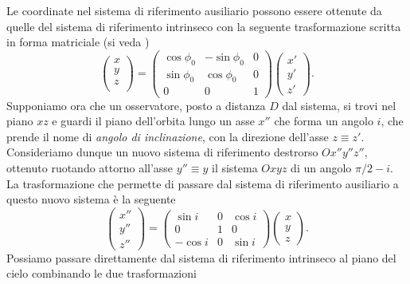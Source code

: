 {Le coordinate nel sistema di riferimento ausiliario possono essere ottenute da
quelle del sistema di riferimento intrinseco con la seguente trasformazione
scritta in forma matriciale (si veda \textcite{goldstein:meccanica})
\begin{equation}
  \begin{pmatrix}
    x \\
    y \\
    z \\
  \end{pmatrix} =
  \begin{pmatrix}
    \cos\phi_0 & -\sin\phi_0 & 0 \\
    \sin\phi_0 & \cos\phi_0  & 0 \\
    0          & 0           & 1
  \end{pmatrix}
  \begin{pmatrix}
    x' \\
    y' \\
    z'
  \end{pmatrix}.
\end{equation}
Supponiamo ora che un osservatore, posto a distanza $D$ dal sistema, si trovi
nel piano $xz$ e guardi il piano dell'orbita lungo un asse $x''$ che forma un
angolo $i$, che prende il nome di \emph{angolo di inclinazione}, con la
direzione dell'asse $z\equiv z'$. Consideriamo dunque un nuovo sistema di
riferimento destrorso $Ox''y''z''$, ottenuto ruotando attorno all'asse
$y''\equiv y$ il sistema $Oxyz$ di un angolo $\pi/2 - i$. La trasformazione che
permette di passare dal sistema di riferimento ausiliario a questo nuovo sistema
è la seguente
\begin{equation}
  \begin{pmatrix}
    x'' \\
    y'' \\
    z''
  \end{pmatrix} =
  \begin{pmatrix}
    \sin i  & 0 & \cos i \\
    0       & 1 & 0      \\
    -\cos i & 0 & \sin i
  \end{pmatrix}
  \begin{pmatrix}
    x \\
    y \\
    z
  \end{pmatrix}.
\end{equation}
Possiamo passare direttamente dal sistema di riferimento intrinseco al piano del
cielo combinando le due trasformazioni
}
